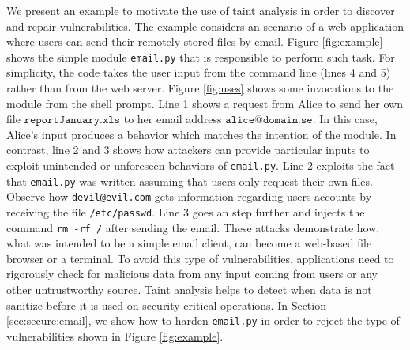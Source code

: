 \documentclass[oribibl]{llncs}
\begin{document}
We present an example to motivate the use of 
taint analysis in order to discover and repair 
vulnerabilities. 
The example considers an scenario of a web application
where users can send their remotely stored files by 
email.
Figure \ref{fig:example} shows the simple module \texttt{email.py}
that is responsible to perform such task.
For simplicity,
the code takes the user input from the 
command line (lines 4 and 5) rather than from 
the web server.
Figure \ref{fig:uses} shows some invocations to the module from the
shell prompt. Line 1 shows a request from 
Alice to send her own file $\texttt{reportJanuary.xls}$ to 
her email address $\texttt{alice@domain.se}$. In this case, 
Alice's input produces a behavior which matches the 
intention of the module. 
In contrast, line 2 and 3 shows how attackers can 
provide particular inputs to exploit unintended 
or unforeseen behaviors of \texttt{email.py}.
Line 2 exploits the fact that \texttt{email.py} 
was written assuming that 
users only request their own files. 
Observe how  
\texttt{devil@evil.com} gets information regarding 
users accounts by receiving the file \texttt{/etc/passwd}. 
Line 3 goes an step further 
and injects the command \texttt{rm -rf /} after sending the email.
These attacks demonstrate how, 
what was intended to be a simple email client,  
can become a web-based file browser or a terminal. To avoid this 
type of vulnerabilities, applications need to rigorously check 
for malicious data from any input coming from users or any other 
untrustworthy source. 
Taint analysis helps to detect when 
data is not sanitize before it is used on security critical 
operations. In Section \ref{sec:secure:email}, we show how to harden 
\texttt{email.py} in order to reject the type of vulnerabilities 
shown in Figure \ref{fig:example}.
\end{document}
